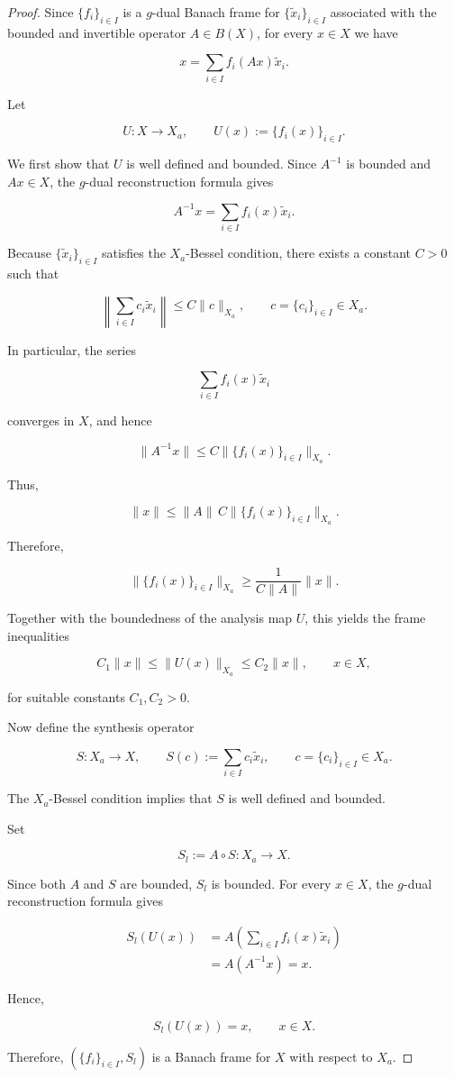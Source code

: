 \documentclass[12pt]{article}
\theoremstyle{definition}
\theoremstyle{remark}
\begin{document}
\begin{proof}
	Since \(\{f_i\}_{i\in I}\) is a \(g\)-dual Banach frame for
	\(\{\tilde{x}_i\}_{i\in I}\) associated with the bounded and invertible
	operator \(A\in B(X)\), for every \(x\in X\) we have
	
	$$
	x=\sum_{i\in I}f_i(Ax)\tilde{x}_i.
	$$
	
	Let
	
	$$
	U:X\to X_a,
	\qquad
	U(x):=\{f_i(x)\}_{i\in I}.
	$$
	
	We first show that \(U\) is well defined and bounded. Since \(A^{-1}\) is
	bounded and \(Ax\in X\), the \(g\)-dual reconstruction formula gives
	
	$$
	A^{-1}x
	=
	\sum_{i\in I}f_i(x)\tilde{x}_i.
	$$
	
	Because \(\{\tilde{x}_i\}_{i\in I}\) satisfies the \(X_a\)-Bessel condition,
	there exists a constant \(C>0\) such that
	
	$$
	\left\|
	\sum_{i\in I}c_i\tilde{x}_i
	\right\|
	\leq C\|c\|_{X_a},
	\qquad c=\{c_i\}_{i\in I}\in X_a.
	$$
	
	In particular, the series
	
	$$
	\sum_{i\in I}f_i(x)\tilde{x}_i
	$$
	
	converges in \(X\), and hence
	
	$$
	\|A^{-1}x\|
	\leq
	C\|\{f_i(x)\}_{i\in I}\|_{X_a}.
	$$
	
	Thus,
	
	$$
	\|x\|
	\leq
	\|A\|\,C\|\{f_i(x)\}_{i\in I}\|_{X_a}.
	$$
	
	Therefore,
	
	$$
	\|\{f_i(x)\}_{i\in I}\|_{X_a}
	\geq
	\frac{1}{C\|A\|}\|x\|.
	$$
	
	Together with the boundedness of the analysis map \(U\), this yields the
	frame inequalities
	
	$$
	C_1\|x\|
	\leq
	\|U(x)\|_{X_a}
	\leq
	C_2\|x\|,
	\qquad x\in X,
	$$
	
	for suitable constants \(C_1,C_2>0\).
	
	Now define the synthesis operator
	
	$$
	S:X_a\to X,
	\qquad
	S(c):=\sum_{i\in I}c_i\tilde{x}_i,
	\qquad c=\{c_i\}_{i\in I}\in X_a.
	$$
	
	The \(X_a\)-Bessel condition implies that \(S\) is well defined and bounded.
	
	Set
	
	$$
	S_l:=A\circ S:X_a\to X.
	$$
	
	Since both \(A\) and \(S\) are bounded, \(S_l\) is bounded. For every
	\(x\in X\), the \(g\)-dual reconstruction formula gives
	
	$$
	\begin{aligned}
		S_l(U(x))
		&=
		A\left(
		\sum_{i\in I}f_i(x)\tilde{x}_i
		\right)\\
		&=
		A\left(A^{-1}x\right)
		=x.
	\end{aligned}
	$$
	
	Hence,
	
	$$
	S_l(U(x))=x,
	\qquad x\in X.
	$$
	
	Therefore, \((\{f_i\}_{i\in I},S_l)\) is a Banach frame for \(X\) with
	respect to \(X_a\).
\end{proof}
\noindent
\end{document}
